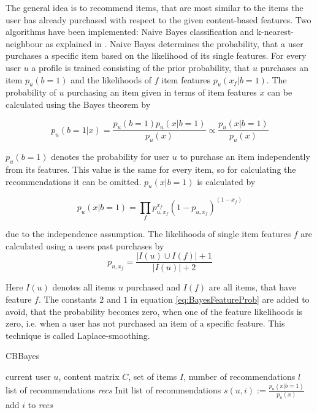 \documentclass[10pt]{reportMaster}
\begin{document}
The general idea is to recommend items, that are most similar to the items the user has already purchased with respect to the given content-based features.
Two algorithms have been implemented: Naive Bayes classification and k-nearest-neighbour as explained in \cite{contentbasedPazzani}.
Naive Bayes determines the probability, that a user purchases a specific item based on the likelihood of its single features.
For every user $u$ a profile is trained consisting of the prior probability, that $u$ purchases an item $p_u(b=1)$ and  the likelihoods of $f$ item features $p_u(x_f|b=1)$.
The probability of $u$ purchasing an item given in terms of item features $x$ can be calculated using the Bayes theorem by 

\begin{equation}
\label{BayesPost}
	p_u(b=1|x) = \frac{p_u(b=1) p_u(x|b=1)}{p_u(x)} \propto \frac{p_u(x|b=1)}{p_u(x)}
\end{equation}

$p_u(b=1)$ denotes the probability for user $u$ to purchase an item independently from its features.
This value is the same for every item, so for calculating the recommendations it can be omitted.
$p_u(x|b=1)$ is calculated by 

\begin{equation}
\label{BayesEvid}
p_u(x|b=1) = \prod_f{p_{u, x_f}^{x_f}(1-p_{u, x_f})^{(1-x_f)}}
\end{equation}

due to the independence assumption.
The likelihoods of single item features $f$ are calculated using a users past purchases by
\begin{equation}
\label{eq:BayesFeatureProb}
p_{u, x_f} = \frac{|I(u) \cup I(f)|+1}{|I(u)|+2}
\end{equation}

Here $I(u)$ denotes all items $u$ purchased and $I(f)$ are all items, that have feature $f$.
The constants $2$ and $1$ in equation \ref{eq:BayesFeatureProb} are added to avoid, that the probability becomes zero, when one of the feature likelihoods is zero, i.e. when a user has not purchased an item of a specific feature.
This technique is called Laplace-smoothing.

\begin{algorithm}
	\caption{CBBayes}
	\label{alg:CBBayes}
	\begin{algorithmic}[1]
		\Require current user $u$, content matrix $C$, set of items $I$, number of recommendations $l$
		\Ensure list of recommendations \textit{recs}
		\State Init list of recommendations 
			\State 	$s(u,i) := \frac{p_u(x|b=1)}{p_u(x)}$
				\State add $i$ to \textit{recs}
			\EndIf
		\EndFor
	\end{algorithmic}	
\end{algorithm}
\end{document}
